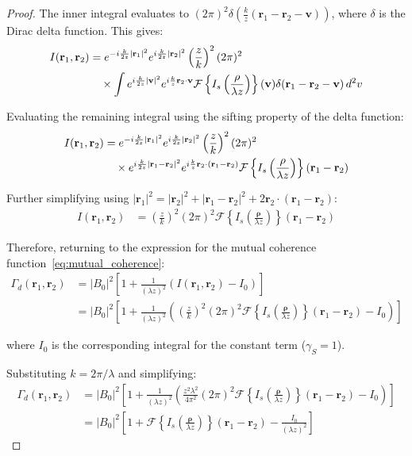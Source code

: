 \documentclass[10pt,a4paper]{amsart}
\begin{document}
\begin{proof}
The inner integral evaluates to $(2\pi)^2 \delta(\frac{k}{z}(\mathbf{r}_1-\mathbf{r}_2-\mathbf{v}))$, where $\delta$ is 
the Dirac delta function. This gives:
\begin{align}
I(\mathbf{r}_1, \mathbf{r}_2) &= e^{-i\frac{k}{2z}|\mathbf{r}_1|^2} e^{i\frac{k}{2z}|\mathbf{r}_2|^2} \left(\frac{z}{k}\right)^2 (2\pi)^2 \\
&\quad \times \int e^{i\frac{k}{2z}|\mathbf{v}|^2} e^{i\frac{k}{z}\mathbf{r}_2 \cdot \mathbf{v}} \mathcal{F}\left\{I_s\left(\frac{\mathbf{\rho}}{\lambda z}\right)\right\}(\mathbf{v}) \delta(\mathbf{r}_1-\mathbf{r}_2-\mathbf{v}) \, d^2v \notag
\end{align}

Evaluating the remaining integral using the sifting property of the delta function:
\begin{align}
I(\mathbf{r}_1, \mathbf{r}_2) &= e^{-i\frac{k}{2z}|\mathbf{r}_1|^2} e^{i\frac{k}{2z}|\mathbf{r}_2|^2} \left(\frac{z}{k}\right)^2 (2\pi)^2 \\
&\quad \times e^{i\frac{k}{2z}|\mathbf{r}_1-\mathbf{r}_2|^2} e^{i\frac{k}{z}\mathbf{r}_2 \cdot (\mathbf{r}_1-\mathbf{r}_2)} \mathcal{F}\left\{I_s\left(\frac{\mathbf{\rho}}{\lambda z}\right)\right\}(\mathbf{r}_1-\mathbf{r}_2) \notag
\end{align}

Further simplifying using $|\mathbf{r}_1|^2 = |\mathbf{r}_2|^2 + |\mathbf{r}_1-\mathbf{r}_2|^2 + 2\mathbf{r}_2 \cdot (\mathbf{r}_1-\mathbf{r}_2)$:
\begin{align}
I(\mathbf{r}_1, \mathbf{r}_2) &= \left(\frac{z}{k}\right)^2 (2\pi)^2 \mathcal{F}\left\{I_s\left(\frac{\mathbf{\rho}}{\lambda z}\right)\right\}(\mathbf{r}_1-\mathbf{r}_2)
\end{align}

Therefore, returning to the expression for the mutual coherence function~\ref{eq:mutual_coherence}:
\begin{align}
\Gamma_d(\mathbf{r}_1, \mathbf{r}_2) &= |B_0|^2 \left[1 + \frac{1}{(\lambda z)^2} \left(I(\mathbf{r}_1, \mathbf{r}_2) - I_0\right)\right] \\
&= |B_0|^2 \left[1 + \frac{1}{(\lambda z)^2} \left(\left(\frac{z}{k}\right)^2 (2\pi)^2 \mathcal{F}\left\{I_s\left(\frac{\mathbf{\rho}}{\lambda z}\right)\right\}(\mathbf{r}_1-\mathbf{r}_2) - I_0\right)\right]
\end{align}

where $I_0$ is the corresponding integral for the constant term ($\gamma_S = 1$).

Substituting $k = 2\pi/\lambda$ and simplifying:
\begin{align}
\Gamma_d(\mathbf{r}_1, \mathbf{r}_2) &= |B_0|^2 \left[1 + \frac{1}{(\lambda z)^2} \left(\frac{z^2 \lambda^2}{4\pi^2} (2\pi)^2 \mathcal{F}\left\{I_s\left(\frac{\mathbf{\rho}}{\lambda z}\right)\right\}(\mathbf{r}_1-\mathbf{r}_2) - I_0\right)\right] \\
&= |B_0|^2 \left[1 + \mathcal{F}\left\{I_s\left(\frac{\mathbf{\rho}}{\lambda z}\right)\right\}(\mathbf{r}_1-\mathbf{r}_2) - \frac{I_0}{(\lambda z)^2}\right]
\end{align}


\end{proof}
\end{document}
